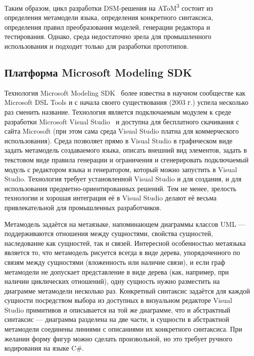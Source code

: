 Таким образом, цикл разработки \ac{DSM}-решения на AToM\textsuperscript{3} состоит из определения метамодели 
языка, определения конкретного синтаксиса, определения правил преобразования моделей, 
генерации редактора и тестирования. Однако, среда недостаточно зрела для промышленного 
использования и подходит только для разработки прототипов.

\subsection{Платформа Microsoft Modeling SDK}
Технология Microsoft Modeling SDK~\cite{cook2007domain} более известна в научном сообществе как Microsoft DSL Tools
и с начала своего существования (2003 г.) успела несколько раз сменить название. Технология является
подключаемым модулем к среде разработки Microsoft Visual Studio~\cite{visualStudio}
и доступна для бесплатного скачивания с сайта Microsoft (при этом сама среда Visual Studio 
платна для коммерческого использования). Среда позволяет прямо в Visual Studio
в графическом виде задать метамодель создаваемого языка, описать внешний вид элементов, 
задать в текстовом виде правила генерации и ограничения и сгенерировать подключаемый модуль с
редактором языка и генератором, который можно запустить в Visual Studio. Технология требует установленной 
Visual Studio и для создания, и для использования предметно-ориентированных решений.
Тем не менее, зрелость технологии и хорошая интеграция её в Visual Studio делают её
весьма привлекательной для промышленных разработчиков.

Метамодель задаётся на метаязыке, напоминающем диаграммы классов UML --- поддерживаются
отношения между сущностями, свойства сущностей, наследование как сущностей, так и связей.
Интересной особенностью метаязыка является то, что метамодель рисуется всегда в виде дерева,
упорядоченного по связям между сущностями (вложенность или наличие связи), и если граф метамодели
не допускает представление в виде дерева (как, например, при наличии циклических отношений),
одну сущность нужно разместить на диаграмме метамодели несколько раз. Конкретный синтаксис
задаётся для каждой сущности посредством выбора из доступных в визуальном редакторе Visual Studio
примитивов и описывается на той же диаграмме, что и абстрактный синтаксис --- диаграмма
разделена на две части, и сущности в абстрактной метамодели соединены линиями с описаниями их конкретного синтаксиса.
При желании форму фигур можно сделать произвольной, но это требует ручного кодирования на языке C\#.

